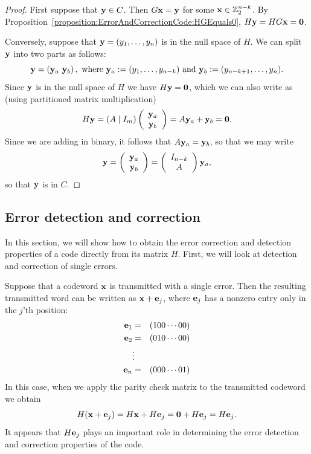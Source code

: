  
\begin{proof}
First suppose that ${\bold y} \in C$. Then $G {\bold x} = {\bold y}$
for some ${\bold x} \in \mathbb{Z}_2^{n-k}$. By Proposition~\ref{proposition:ErrorAndCorrectionCode:HGEquals0}, $H {\bold y} = HG
{\bold x} = {\bold 0}$. 
 
 
Conversely, suppose that ${\bold y} = (y_1, \ldots, y_n)$ is
in the null space of $H$. We can split ${\bold y}$ into two parts as follows:
\[{\bold y} =  \left(  {\bold y}_a \,\, {\bold y}_b
 \right), \text{ where } {\bold y}_a := (y_1, \ldots, y_{n-k}) \text{ and } {\bold y}_b := (y_{n-k+1}, \ldots, y_n). \]
Since  ${\bold y}$ is in the null space of $H$ we have 
 $H
{\bold y} = {\bold 0}$, which we can also write as (using partitioned matrix multiplication)
\[ H {\bold y} = ( A \mid I_m) \left(
 \begin{array}{c}
 {\bold y}_a \\
{\bold y}_b
 \end{array} \right) = A {\bold y}_a + {\bold y}_b = {\bold 0}.
 \]
Since we are adding in binary, it follows that $A {\bold y}_a = {\bold y}_b$, so that we may write
\[ 
 {\bold y} = \left(
 \begin{array}{c}
 {\bold y}_a \\
{\bold y}_b
 \end{array} \right)
 = \left(
 \begin{array}{c}
 I_{n-k} \\
A
 \end{array} \right) 
 {\bold y}_a,
 \]
so that ${\bold y}$ is in $C$.
\end{proof}
 
\subsection{Error detection and correction}
\label{subsec:ErrorAndCorrectionCode:EncodingBlockLinearCodes:DetectCorrectError}
 
In this section, we will show how to  obtain the error correction and detection properties of a code directly from its matrix $H$. First, we will look at detection and correction of single errors.

Suppose that a codeword ${\bold x}$ is transmitted with a single error. Then the resulting transmitted word can be written as ${\bold x} + {\bold e}_j$, where ${\bold e}_j$ has a nonzero entry only in the $j$'th position:
\begin{eqnarray*}
{\bold e}_1 & = & (100 \cdots 00) \\
{\bold e}_2 & = & (010 \cdots 00) \\
 & \vdots & \\
{\bold e}_n & = & (000 \cdots 01)
\end{eqnarray*}
In this case, when we apply the parity check matrix to the transmitted codeword we obtain
\[ H({\bold x} + {\bold e}_j) = H{\bold x} + H{\bold e}_j = {\bold 0} + H{\bold e}_j  = H{\bold e}_j. \]
It appears that $H{\bold e}_j$ plays an important role in determining the error detection and correction properties of the code.

